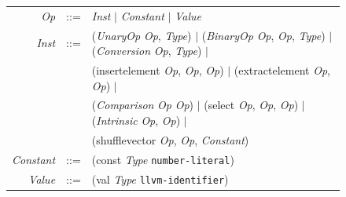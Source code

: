 \begin{figure}[tbp]
  \small
  \begin{tabular}{r c l}
    \emph{Op} &::=& \emph{Inst} $\vert$ \emph{Constant} $\vert$ \emph{Value} \\
    \emph{Inst}  &::=& (\emph{UnaryOp} \emph{Op}, \emph{Type}) $\vert$ (\emph{BinaryOp} \emph{Op}, \emph{Op}, \emph{Type}) $\vert$ (\emph{Conversion} \emph{Op}, \emph{Type}) $\vert$\\
              && (insertelement \emph{Op}, \emph{Op}, \emph{Op}) $\vert$ (extractelement \emph{Op}, \emph{Op})  $\vert$\\
              && (\emph{Comparison} \emph{Op} \emph{Op}) $\vert$ (select \emph{Op}, \emph{Op}, \emph{Op}) $\vert$ (\emph{Intrinsic} \emph{Op}, \emph{Op}) $\vert$ \\
              && (shufflevector \emph{Op}, \emph{Op}, \emph{Constant}) \\
    \emph{Constant} &::=& (const \emph{Type} \texttt{number-literal}) \\
    \emph{Value} &::=& (val \emph{Type} \texttt{llvm-identifier}) \\


\end{tabular}
\end{figure}
